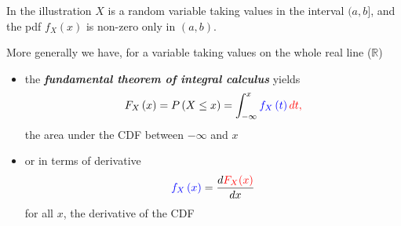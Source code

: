 \documentclass[notes=show,smaller,handout]{beamer}\usepackage[]{graphicx}\usepackage[]{color}
\renewcommand{\Pr}{P}
\newenvironment{stepitemize}{\begin{itemize}[<+->]}{\end{itemize} }
\begin{document}
\begin{frame}{\secname}
  In the illustration $X$ is a random variable taking values in the interval $(a,b]$, and the pdf $f_{X}\left( x\right) $ is non-zero only in $(a,b)$.

  \medskip

  More generally we have, for a variable taking values on the whole real line ($\mathbb{R}$) \medskip

  \begin{itemize}
  \item the \textbf{\emph{fundamental theorem of integral calculus}} yields
  \color{red}
  $$F_{X}\left( x\right) =\Pr \left( X\leq x\right) =\int_{-\infty}^{x}\color{blue}f_{X}\left(
  t\right)\color{red} dt,$$%
  \color{black}
  the area under the CDF between $-\infty$ and $x$ \medskip

  \item or in terms of derivative
  $$
  \color{blue}f_{X}\left( x\right) \color{black} = \frac{d\color{red}F_{X}(x) \color{black}}{\color{black} dx}
  $$
  for all $x$, the derivative of the CDF
  \end{itemize}
\end{frame}%
\end{document}
